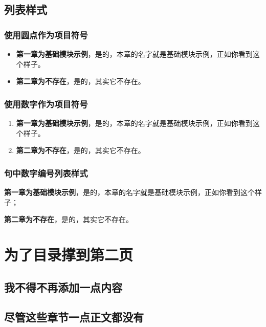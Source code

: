 \documentclass[a4paper,AutoFakeBold,oneside,12pt]{book}
\begin{document}
\section{列表样式}

\subsection{使用圆点作为项目符号}

\begin{itemize}
\item \textbf{第一章为基础模块示例}，是的，本章的名字就是基础模块示例，正如你看到这个样子。
\item \textbf{第二章为不存在}，是的，其实它不存在。
\end{itemize}

\subsection{使用数字作为项目符号}

\begin{enumerate}
\item \textbf{第一章为基础模块示例}，是的，本章的名字就是基础模块示例，正如你看到这个样子。
\item \textbf{第二章为不存在}，是的，其实它不存在。
\end{enumerate}

\subsection{句中数字编号列表样式}

\begin{enumerate*}
    \item \textbf{第一章为基础模块示例}，是的，本章的名字就是基础模块示例，正如你看到这个样子；
    \item \textbf{第二章为不存在}，是的，其实它不存在。
\end{enumerate*}

\chapter{为了目录撑到第二页}
\section{我不得不再添加一点内容}
\section{尽管这些章节一点正文都没有}
\end{document}
